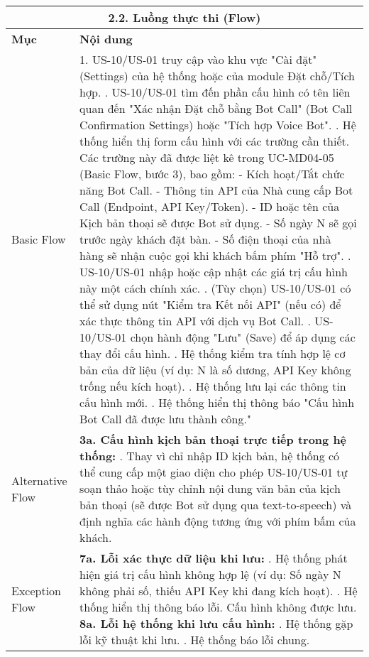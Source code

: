 \begin{longtable}{|m{4cm}|p{11cm}|}
\hline
\multicolumn{2}{|c|}{\textbf{2.2. Luồng thực thi (Flow)}} \\
\hline
\textbf{Mục} & \textbf{Nội dung} \\
\hline
Basic Flow & 1. US-10/US-01 truy cập vào khu vực "Cài đặt" (Settings) của hệ thống hoặc của module Đặt chỗ/Tích hợp. \newline 2. US-10/US-01 tìm đến phần cấu hình có tên liên quan đến "Xác nhận Đặt chỗ bằng Bot Call" (Bot Call Confirmation Settings) hoặc "Tích hợp Voice Bot". \newline 3. Hệ thống hiển thị form cấu hình với các trường cần thiết. Các trường này đã được liệt kê trong UC-MD04-05 (Basic Flow, bước 3), bao gồm: \newline    - Kích hoạt/Tắt chức năng Bot Call. \newline    - Thông tin API của Nhà cung cấp Bot Call (Endpoint, API Key/Token). \newline    - ID hoặc tên của Kịch bản thoại sẽ được Bot sử dụng. \newline    - Số ngày N sẽ gọi trước ngày khách đặt bàn. \newline    - Số điện thoại của nhà hàng sẽ nhận cuộc gọi khi khách bấm phím "Hỗ trợ". \newline 4. US-10/US-01 nhập hoặc cập nhật các giá trị cấu hình này một cách chính xác. \newline 5. (Tùy chọn) US-10/US-01 có thể sử dụng nút "Kiểm tra Kết nối API" (nếu có) để xác thực thông tin API với dịch vụ Bot Call. \newline 6. US-10/US-01 chọn hành động "Lưu" (Save) để áp dụng các thay đổi cấu hình. \newline 7. Hệ thống kiểm tra tính hợp lệ cơ bản của dữ liệu (ví dụ: N là số dương, API Key không trống nếu kích hoạt). \newline 8. Hệ thống lưu lại các thông tin cấu hình mới. \newline 9. Hệ thống hiển thị thông báo "Cấu hình Bot Call đã được lưu thành công." \\
\hline
Alternative Flow & \textbf{3a. Cấu hình kịch bản thoại trực tiếp trong hệ thống:} \newline    1. Thay vì chỉ nhập ID kịch bản, hệ thống có thể cung cấp một giao diện cho phép US-10/US-01 tự soạn thảo hoặc tùy chỉnh nội dung văn bản của kịch bản thoại (sẽ được Bot sử dụng qua text-to-speech) và định nghĩa các hành động tương ứng với phím bấm của khách. \\
\hline
Exception Flow & \textbf{7a. Lỗi xác thực dữ liệu khi lưu:} \newline    1. Hệ thống phát hiện giá trị cấu hình không hợp lệ (ví dụ: Số ngày N không phải số, thiếu API Key khi đang kích hoạt). \newline    2. Hệ thống hiển thị thông báo lỗi. Cấu hình không được lưu. \newline \textbf{8a. Lỗi hệ thống khi lưu cấu hình:} \newline    1. Hệ thống gặp lỗi kỹ thuật khi lưu. \newline    2. Hệ thống báo lỗi chung. \\

\end{longtable}
